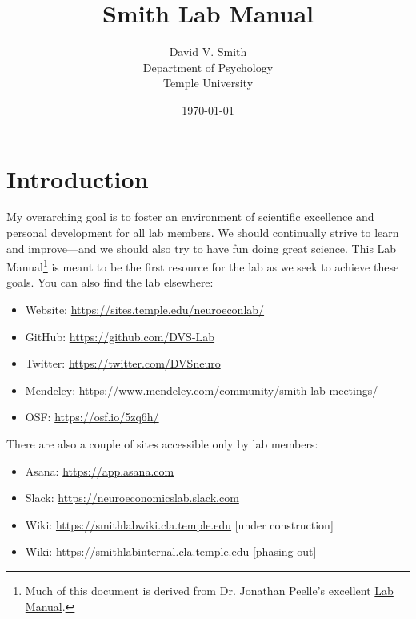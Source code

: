 \documentclass[letterpaper,12pt,oneside]{memoir}
\begin{document}
\title{Smith Lab Manual}
\author{David V. Smith\\Department of Psychology\\Temple University}
\date{\today}


\maketitle

\pagestyle{titlingpage}


\cleardoublepage
\frontmatter
\tableofcontents
\cleardoublepage

\mainmatter

\pagestyle{headings}

\chapter{Introduction}

My overarching goal is to foster an environment of scientific excellence and personal development for all lab members. We should continually strive to learn and improve---and we should also try to have fun doing great science. This Lab Manual\footnote{Much of this document is derived from Dr. Jonathan Peelle's excellent \href{https://github.com/jpeelle/peellelab\_manual/}{Lab Manual}.} is meant to be the first resource for the lab as we seek to achieve these goals. You can also find the lab elsewhere:

\begin{itemize}[noitemsep]
\item Website: \url{https://sites.temple.edu/neuroeconlab/}
\item GitHub: \url{https://github.com/DVS-Lab}
\item Twitter: \url{https://twitter.com/DVSneuro}
\item Mendeley: \url{https://www.mendeley.com/community/smith-lab-meetings/} 
\item OSF: \url{https://osf.io/5zq6h/}
\end{itemize}

\noindent There are also a couple of sites accessible only by lab members:

\begin{itemize}[noitemsep]
\item Asana: \url{https://app.asana.com}
\item Slack: \url{https://neuroeconomicslab.slack.com}
\item Wiki: \url{https://smithlabwiki.cla.temple.edu} [under construction]
\item Wiki: \url{https://smithlabinternal.cla.temple.edu} [phasing out]
\end{itemize}
\end{document}
